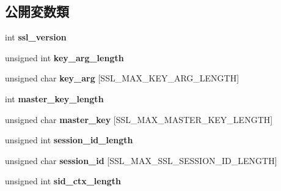 \subsection*{公開変数類}
\begin{DoxyCompactItemize}
\item 
\hypertarget{structssl__session__st_a551e39a73ea78af29979d80d8a6db6f9}{}int {\bfseries ssl\+\_\+version}\label{structssl__session__st_a551e39a73ea78af29979d80d8a6db6f9}

\item 
\hypertarget{structssl__session__st_aa59c33cbe59e8aa9fd097d2034665935}{}unsigned int {\bfseries key\+\_\+arg\+\_\+length}\label{structssl__session__st_aa59c33cbe59e8aa9fd097d2034665935}

\item 
\hypertarget{structssl__session__st_a5f697ed1d136a066dcaa054a5aca54d5}{}unsigned char {\bfseries key\+\_\+arg} \mbox{[}S\+S\+L\+\_\+\+M\+A\+X\+\_\+\+K\+E\+Y\+\_\+\+A\+R\+G\+\_\+\+L\+E\+N\+G\+T\+H\mbox{]}\label{structssl__session__st_a5f697ed1d136a066dcaa054a5aca54d5}

\item 
\hypertarget{structssl__session__st_a368c71211d55bcd3528a752c15e14e5d}{}int {\bfseries master\+\_\+key\+\_\+length}\label{structssl__session__st_a368c71211d55bcd3528a752c15e14e5d}

\item 
\hypertarget{structssl__session__st_ae0d5ecf4472dbff80b1ed36ce9c051c3}{}unsigned char {\bfseries master\+\_\+key} \mbox{[}S\+S\+L\+\_\+\+M\+A\+X\+\_\+\+M\+A\+S\+T\+E\+R\+\_\+\+K\+E\+Y\+\_\+\+L\+E\+N\+G\+T\+H\mbox{]}\label{structssl__session__st_ae0d5ecf4472dbff80b1ed36ce9c051c3}

\item 
\hypertarget{structssl__session__st_a593371acd210b99ad600853361b807ce}{}unsigned int {\bfseries session\+\_\+id\+\_\+length}\label{structssl__session__st_a593371acd210b99ad600853361b807ce}

\item 
\hypertarget{structssl__session__st_a3e03d6073d29316d9eaecb78938ec92f}{}unsigned char {\bfseries session\+\_\+id} \mbox{[}S\+S\+L\+\_\+\+M\+A\+X\+\_\+\+S\+S\+L\+\_\+\+S\+E\+S\+S\+I\+O\+N\+\_\+\+I\+D\+\_\+\+L\+E\+N\+G\+T\+H\mbox{]}\label{structssl__session__st_a3e03d6073d29316d9eaecb78938ec92f}

\item 
\hypertarget{structssl__session__st_a22ec3aac135c2b8268e0ea69c66fc829}{}unsigned int {\bfseries sid\+\_\+ctx\+\_\+length}\label{structssl__session__st_a22ec3aac135c2b8268e0ea69c66fc829}


\end{DoxyCompactItemize}
